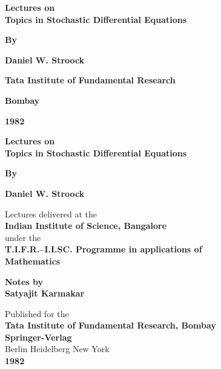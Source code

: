 \phantom{a}
\thispagestyle{empty}
\begin{center}
{\Large\bf Lectures on}\\[5pt]
{\Large\bf Topics in Stochastic Differential Equations}
\vskip 1cm

{\bf By}

{\large\bf Daniel W. Stroock}
\vfill

{\bf Tata Institute of Fundamental Research}

{\bf Bombay}

{\bf 1982}
\end{center}
\eject

\thispagestyle{empty}
\begin{center}
{\large\bf Lectures on}\\[5pt]
{\large\bf Topics in Stochastic Differential Equations}
\vskip 1cm

{\bf By}

{\large\bf Daniel W. Stroock}
\vfill

{Lectures delivered at the}\\[5pt]
{\bf Indian Institute of Science, Bangalore}\\[5pt]
{under the}\\[5pt]
{\bf T.I.F.R.--I.I.SC. Programme in applications of}\\[5pt]
{\bf Mathematics}
\vfill

{\bf Notes by}\\[5pt]
{\large\bf Satyajit Karmakar}

\vfill
{Published for the}\\[5pt]
{\bf Tata Institute of Fundamental Research, Bombay}\\[5pt]
{\bf Springer-Verlag}\\[5pt]
{Berlin Heidelberg New York}\\[5pt]
{\bf 1982}
\end{center}
\eject

